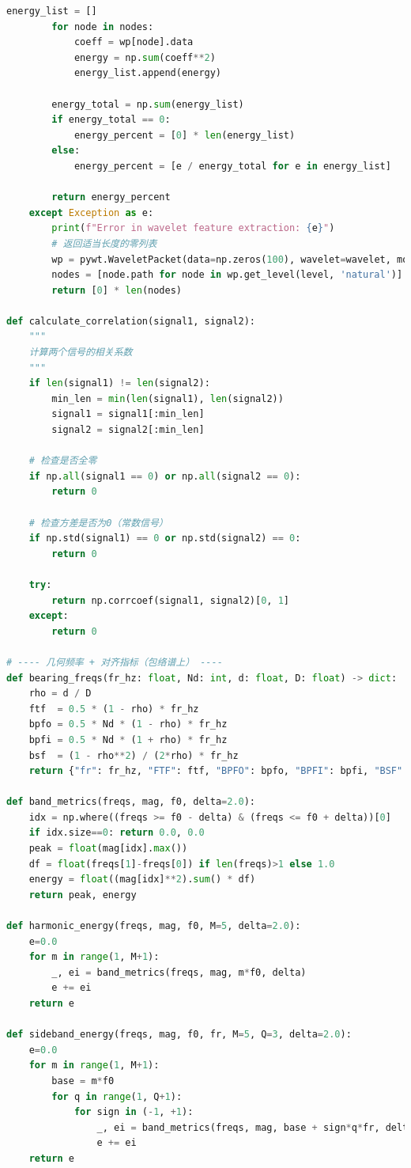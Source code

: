 \documentclass[a4paper]{CPIPC}
\numberwithin{equation}{section}
\begin{document}
\begin{lstlisting}[language=Python, caption=Feature Extraction]
        energy_list = []
        for node in nodes:
            coeff = wp[node].data
            energy = np.sum(coeff**2)
            energy_list.append(energy)
        
        energy_total = np.sum(energy_list)
        if energy_total == 0:
            energy_percent = [0] * len(energy_list)
        else:
            energy_percent = [e / energy_total for e in energy_list]
        
        return energy_percent
    except Exception as e:
        print(f"Error in wavelet feature extraction: {e}")
        # 返回适当长度的零列表
        wp = pywt.WaveletPacket(data=np.zeros(100), wavelet=wavelet, mode='symmetric', maxlevel=level)
        nodes = [node.path for node in wp.get_level(level, 'natural')]
        return [0] * len(nodes)

def calculate_correlation(signal1, signal2):
    """
    计算两个信号的相关系数
    """
    if len(signal1) != len(signal2):
        min_len = min(len(signal1), len(signal2))
        signal1 = signal1[:min_len]
        signal2 = signal2[:min_len]
    
    # 检查是否全零
    if np.all(signal1 == 0) or np.all(signal2 == 0):
        return 0
    
    # 检查方差是否为0（常数信号）
    if np.std(signal1) == 0 or np.std(signal2) == 0:
        return 0
    
    try:
        return np.corrcoef(signal1, signal2)[0, 1]
    except:
        return 0

# ---- 几何频率 + 对齐指标（包络谱上） ----
def bearing_freqs(fr_hz: float, Nd: int, d: float, D: float) -> dict:
    rho = d / D
    ftf  = 0.5 * (1 - rho) * fr_hz
    bpfo = 0.5 * Nd * (1 - rho) * fr_hz
    bpfi = 0.5 * Nd * (1 + rho) * fr_hz
    bsf  = (1 - rho**2) / (2*rho) * fr_hz
    return {"fr": fr_hz, "FTF": ftf, "BPFO": bpfo, "BPFI": bpfi, "BSF": bsf, "rho": rho}

def band_metrics(freqs, mag, f0, delta=2.0):
    idx = np.where((freqs >= f0 - delta) & (freqs <= f0 + delta))[0]
    if idx.size==0: return 0.0, 0.0
    peak = float(mag[idx].max())
    df = float(freqs[1]-freqs[0]) if len(freqs)>1 else 1.0
    energy = float((mag[idx]**2).sum() * df)
    return peak, energy

def harmonic_energy(freqs, mag, f0, M=5, delta=2.0):
    e=0.0
    for m in range(1, M+1):
        _, ei = band_metrics(freqs, mag, m*f0, delta)
        e += ei
    return e

def sideband_energy(freqs, mag, f0, fr, M=5, Q=3, delta=2.0):
    e=0.0
    for m in range(1, M+1):
        base = m*f0
        for q in range(1, Q+1):
            for sign in (-1, +1):
                _, ei = band_metrics(freqs, mag, base + sign*q*fr, delta)
                e += ei
    return e


\end{lstlisting}
\end{document}
